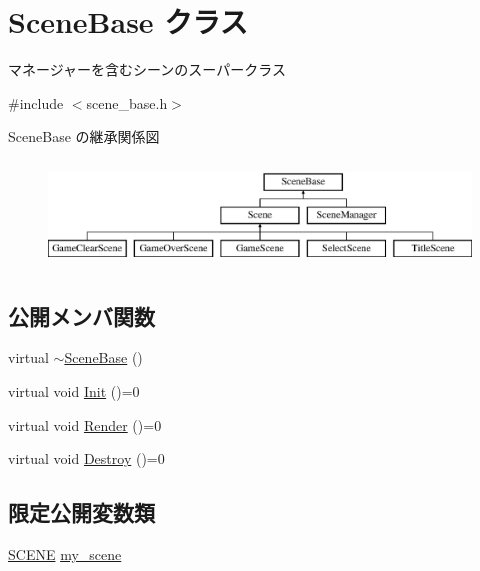 \hypertarget{class_scene_base}{}\section{Scene\+Base クラス}
\label{class_scene_base}


マネージャーを含むシーンのスーパークラス  




{\ttfamily \#include $<$scene\+\_\+base.\+h$>$}

Scene\+Base の継承関係図\begin{figure}[H]
\begin{center}
\leavevmode
\includegraphics[height=2.823529cm]{class_scene_base}
\end{center}
\end{figure}
\subsection*{公開メンバ関数}
\begin{DoxyCompactItemize}
\item 
virtual \mbox{\hyperlink{class_scene_base_a187dd160e5a16909bcc6529851e38318}{$\sim$\+Scene\+Base}} ()
\item 
virtual void \mbox{\hyperlink{class_scene_base_a24d7db43c819924dc8b07b436f6d3148}{Init}} ()=0
\item 
virtual void \mbox{\hyperlink{class_scene_base_ad981674ce731ea267f398e889bbb9dc3}{Render}} ()=0
\item 
virtual void \mbox{\hyperlink{class_scene_base_a7c5b54020bc519b4dadfe9770d6b27f7}{Destroy}} ()=0
\end{DoxyCompactItemize}
\subsection*{限定公開変数類}
\begin{DoxyCompactItemize}
\item 
\mbox{\hyperlink{scene__base_8h_a24cee5343fb9d0706ead6e8601f363be}{S\+C\+E\+NE}} \mbox{\hyperlink{class_scene_base_a18dcdbacfbd98f73099c3cbeb70ae3b8}{my\+\_\+scene}}
\end{DoxyCompactItemize}


